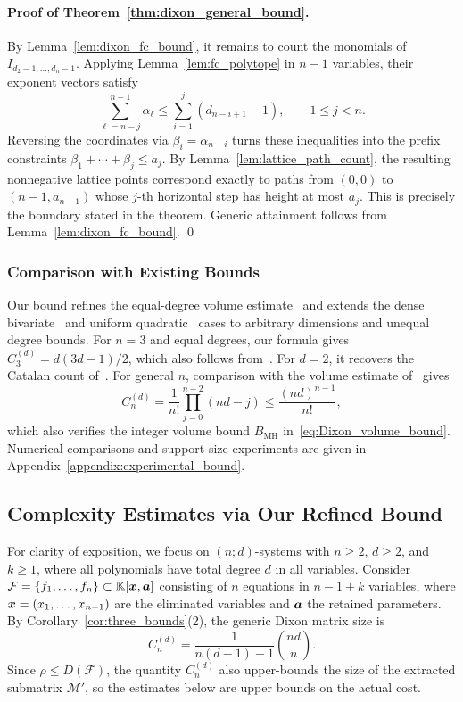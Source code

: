 \paragraph{Proof of Theorem~\ref{thm:dixon_general_bound}.}
By Lemma~\ref{lem:dixon_fc_bound}, it remains to count the
monomials of $I_{d_2-1,\ldots,d_n-1}$.
Applying Lemma~\ref{lem:fc_polytope} in $n-1$ variables,
their exponent vectors satisfy
\[
\sum_{\ell=n-j}^{n-1}\alpha_\ell
\le \sum_{i=1}^{j}(d_{n-i+1}-1),
\qquad 1\le j<n.
\]
Reversing the coordinates via $\beta_i=\alpha_{n-i}$ turns
these inequalities into the prefix constraints
$\beta_1+\cdots+\beta_j\le a_j$.
By Lemma~\ref{lem:lattice_path_count}, the resulting
nonnegative lattice points correspond exactly to paths from
$(0,0)$ to $(n-1,a_{n-1})$ whose $j$-th horizontal step has
height at most $a_j$. This is precisely the boundary stated
in the theorem. Generic attainment follows from
Lemma~\ref{lem:dixon_fc_bound}.
\qed

\subsubsection{Comparison with Existing Bounds}

Our bound refines the equal-degree volume estimate~\cite{DBLP:conf/stoc/KapurS96} and extends the dense bivariate~\cite{ChtcherbaKapur2004Bivariate} and uniform quadratic~\cite{cryptoeprint:2005/312} cases to arbitrary dimensions and unequal degree bounds. For $n=3$ and equal degrees, our formula gives $C_3^{(d)}=d(3d-1)/2$, which also follows from~\cite[Theorem~4.4]{ChtcherbaKapur2004Bivariate}. For $d=2$, it recovers the Catalan count of~\cite{cryptoeprint:2005/312}. For general $n$, comparison with the volume estimate of~\cite[Theorem~4.3]{DBLP:conf/stoc/KapurS96} gives
\[
C_n^{(d)}=\frac1{n!}\prod_{j=0}^{n-2}(nd-j)
\le\frac{(nd)^{n-1}}{n!},
\]
which also verifies the integer volume bound $B_{\mathrm{MH}}$ in~\eqref{eq:Dixon_volume_bound}. Numerical comparisons and support-size experiments are given in Appendix~\ref{appendix:experimental_bound}.

\subsection{Complexity Estimates via Our Refined Bound}\label{Section:Estimate}

For clarity of exposition, we focus on $(n;d)$-systems with $n\ge2$, $d\ge2$, and $k\ge1$, where all polynomials have total degree $d$ in all variables. Consider $\mathcal{F} = \{f_1, \ldots, f_n\} \subset \mathbb{K}[{\boldsymbol{x}},{\boldsymbol{a}}]$ consisting of $n$ equations in $n-1+k$ variables, where ${\boldsymbol{x}}=(x_1,\ldots,x_{n-1})$ are the eliminated variables and ${\boldsymbol{a}}$ the retained parameters. By Corollary~\ref{cor:three_bounds}(2), the generic Dixon matrix size is
\[
C_n^{(d)} = \frac{1}{n(d-1)+1}\binom{nd}{n}.
\]
Since $\rho\le D(\mathcal{F})$, the quantity $C_n^{(d)}$ also upper-bounds the size of the extracted submatrix $\mathcal{M}'$, so the estimates below are upper bounds on the actual cost. 

